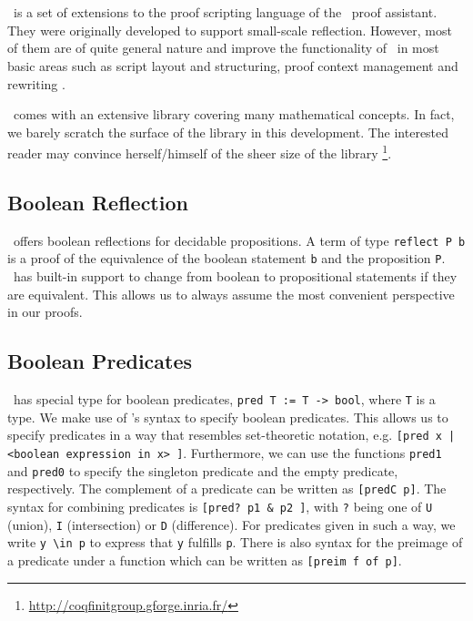 \section{\ssreflect}


\ssreflect\ is a set of extensions to the proof scripting language of the \coq\ proof assistant. 
They were originally developed to support small-scale reflection. 
However, most of them are of quite general nature and improve the functionality of \coq\ in most basic areas such as script layout and structuring, proof context management and rewriting \cite{gonthier:inria-00258384}.

\ssreflect\ comes with an extensive library covering many mathematical concepts. 
In fact, we barely scratch the surface of the library in this development. 
The interested reader may convince herself/himself of the sheer size of the library%
\footnote{\url{http://coqfinitgroup.gforge.inria.fr/}}.

\subsection{Boolean Reflection}
\ssreflect\ offers boolean reflections for decidable propositions. 
A term of type \lstinline{reflect P b} is a proof of the equivalence of the boolean statement \lstinline{b} and the proposition \lstinline{P}.
\ssreflect\ has built-in support to change from boolean to propositional statements if they are equivalent. 
This allows us to always assume the most convenient perspective in our proofs.


\subsection{Boolean Predicates}
\ssreflect\ has special type for boolean predicates, \lstinline{pred T := T -> bool}, where \lstinline{T} is a type.
We make use of \ssreflect's syntax to specify boolean predicates.
This allows us to specify predicates in a way that resembles set-theoretic notation, e.g. 
\lstinline{[pred x | <boolean expression in x> ]}.
Furthermore, we can use the functions \lstinline{pred1} and \lstinline{pred0} to specify the singleton predicate and the empty predicate, respectively.
The complement of a predicate can be written as \lstinline{[predC p]}. 
The syntax for combining predicates is \lstinline{[pred? p1 & p2 ]}, with \lstinline{?} being one of 
\lstinline{U} (union), \lstinline{I} (intersection) or \lstinline{D} (difference).
For predicates given in such a way, we write \lstinline{y \in p} to express that \lstinline{y} fulfills \lstinline{p}.
There is also syntax for the preimage of a predicate under a function
which can be written as \lstinline{[preim f of p]}.

